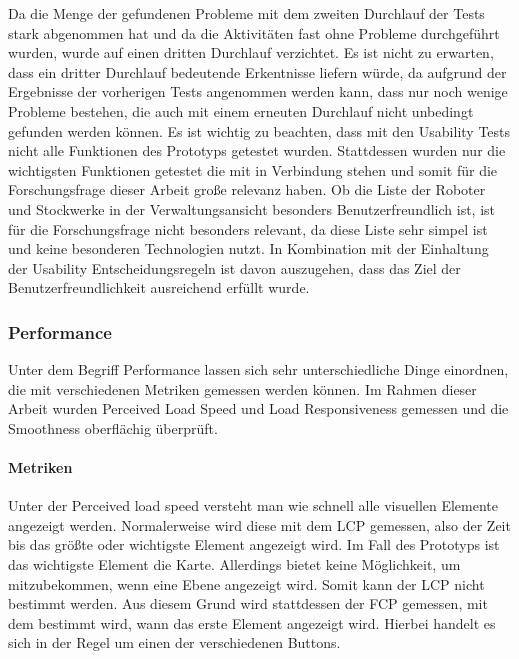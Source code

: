 Da die Menge der gefundenen Probleme mit dem zweiten Durchlauf der Tests stark abgenommen hat und da die Aktivitäten fast ohne Probleme durchgeführt wurden, wurde auf einen dritten Durchlauf verzichtet. Es ist nicht zu erwarten, dass ein dritter Durchlauf bedeutende Erkentnisse liefern würde, da aufgrund der Ergebnisse der vorherigen Tests angenommen werden kann, dass nur noch wenige Probleme bestehen, die auch mit einem erneuten Durchlauf nicht unbedingt gefunden werden können. Es ist wichtig zu beachten, dass mit den Usability Tests nicht alle Funktionen des Prototyps getestet wurden. Stattdessen wurden nur die wichtigsten Funktionen getestet die mit \deckgl{} in Verbindung stehen und somit für die Forschungsfrage dieser Arbeit große relevanz haben. Ob die Liste der Roboter und Stockwerke in der Verwaltungsansicht besonders Benutzerfreundlich ist, ist für die Forschungsfrage nicht besonders relevant, da diese Liste sehr simpel ist und keine besonderen Technologien nutzt. In Kombination mit der Einhaltung der Usability Entscheidungsregeln ist davon auszugehen, dass das Ziel der Benutzerfreundlichkeit ausreichend erfüllt wurde.

\subsubsection{Performance}
Unter dem Begriff Performance lassen sich sehr unterschiedliche Dinge einordnen, die mit verschiedenen Metriken gemessen werden können. Im Rahmen dieser Arbeit wurden Perceived Load Speed und Load Responsiveness gemessen und die Smoothness oberflächig überprüft.

\paragraph{Metriken}

Unter der Perceived load speed versteht man wie schnell alle visuellen Elemente angezeigt werden. Normalerweise wird diese mit dem \ac{LCP} gemessen, also der Zeit bis das größte oder wichtigste Element angezeigt wird. Im Fall des Prototyps ist das wichtigste Element die Karte. Allerdings bietet \deckgl{} keine Möglichkeit, um mitzubekommen, wenn eine Ebene angezeigt wird. Somit kann der \ac{LCP} nicht bestimmt werden. Aus diesem Grund wird stattdessen der \ac{FCP} gemessen, mit dem bestimmt wird, wann das erste Element angezeigt wird. Hierbei handelt es sich in der Regel um einen der verschiedenen Buttons.

